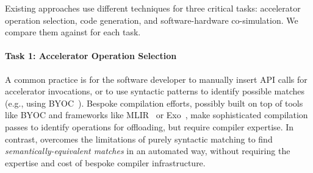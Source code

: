 Existing approaches use different techniques for three critical tasks:
accelerator operation selection, code generation, and software-hardware co-simulation. 
We compare them against {\TLA} for each task.

\paragraph*{Task 1: Accelerator Operation Selection} 
A common practice is for the software developer to manually insert API calls for accelerator invocations, or to use syntactic patterns to identify possible matches (e.g., using BYOC~\cite{chen2021byoc}). 
Bespoke compilation efforts, possibly built on top of tools like BYOC and frameworks like MLIR~\cite{lattner2021mlir} or Exo~\cite{ExoPldi22},
make sophisticated compilation passes to identify operations for offloading, %
but require compiler expertise. 
In contrast, \TLA overcomes the limitations of purely syntactic matching to find \emph{semantically-equivalent matches} in an automated way, without requiring the expertise and cost of bespoke compiler infrastructure.

